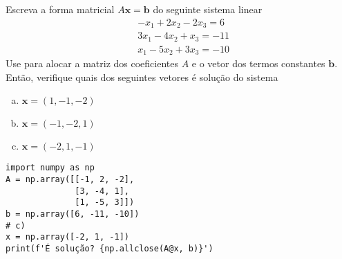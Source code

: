 \begin{exer}\label{cap_arr_sec_mat:exer:sislin}
  Escreva a forma matricial $A\pmb{x} = \pmb{b}$ do seguinte sistema linear
  \begin{subequations}
    \begin{align}
      &-x_1 + 2x_2 - 2x_3 = 6\\
      &3x_1 - 4x_2 + x_3 = -11\\
      &x_1 -5x_2 + 3x_3 = -10
    \end{align}
  \end{subequations}
  Use {\PYTHONnumpyDOTarray} para alocar a matriz dos coeficientes $A$ e o vetor dos termos constantes $\pmb{b}$. Então, verifique quais dos seguintes vetores é solução do sistema
  \begin{enumerate}[a)]
  \item $\pmb{x} = (1, -1, -2)$
  \item $\pmb{x} = (-1, -2, 1)$
  \item $\pmb{x} = (-2, 1, -1)$
  \end{enumerate}
\end{exer}
\begin{resp}

\begin{lstlisting}
import numpy as np
A = np.array([[-1, 2, -2],
              [3, -4, 1],
              [1, -5, 3]])
b = np.array([6, -11, -10])
# c)
x = np.array([-2, 1, -1])
print(f'É solução? {np.allclose(A@x, b)}')
\end{lstlisting}

\end{resp}

